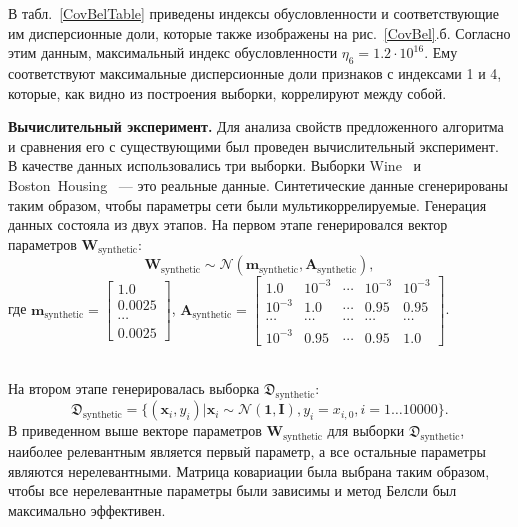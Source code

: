 В табл.~\ref{CovBelTable} приведены индексы обусловленности и соответствующие им дисперсионные доли, которые также изображены на рис.~\ref{CovBel}.б. Согласно этим данным, максимальный индекс обусловленности $\eta_6 = 1.2\cdot 10^{16}$. Ему соответствуют максимальные дисперсионные доли признаков с индексами 1 и 4, которые, как видно из построения выборки, коррелируют между собой.


\textbf{Вычислительный эксперимент. }
Для анализа свойств предложенного алгоритма и сравнения его с существующими был проведен вычислительный эксперимент.
В качестве данных использовались три выборки. Выборки Wine~\cite{wine} и Boston~Housing~\cite{boston}  --- это реальные данные. Синтетические данные сгенерированы таким образом, чтобы параметры сети были мультикоррелируемые. Генерация данных состояла из двух этапов. 
На первом этапе генерировался вектор параметров $\mathbf{W}_{\text{synthetic}}$:
$$\mathbf{W}_{\text{synthetic}}  \sim \mathcal{N}(\textbf{m}_{\text{synthetic}}, \textbf{A}_{\text{synthetic}}),$$ 
где 
$\textbf{m}_{\text{synthetic}} = \begin{bmatrix}
1.0\\
0.0025\\
\cdots\\
0.0025
\end{bmatrix}$,
$\textbf{A}_{\text{synthetic}} = \begin{bmatrix}
1.0& 10^{-3}& \cdots& 10^{-3}& 10^{-3}\\
10^{-3}& 1.0& \cdots& 0.95& 0.95\\
\cdots&\cdots&\cdots&\cdots&\cdots\\
10^{-3}& 0.95& \cdots& 0.95& 1.0
\end{bmatrix}$.


~\\На втором этапе генерировалась выборка $\mathfrak{D}_{\text{synthetic}}$:
$$\mathfrak{D}_{\text{synthetic}} = \{(\textbf{x}_i,y_i)| \textbf{x}_i \sim  \mathcal{N}(\textbf{1}, \textbf{I}), y_i = x_{i,0}, i = 1 \dots 10000\}.$$
В приведенном выше векторе параметров $\mathbf{W}_{\text{synthetic}}$ для выборки $\mathfrak{D}_{\text{synthetic}}$, наиболее релевантным является первый параметр, а все остальные параметры являются нерелевантными. Матрица ковариации была выбрана таким образом, чтобы все нерелевантные параметры были зависимы и метод Белсли был максимально эффективен.



